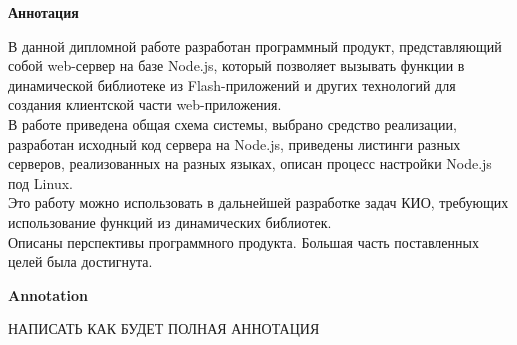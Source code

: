 \begin{center}
\textbf{Аннотация}
\end{center}
В данной дипломной работе разработан программный продукт, представляющий собой web-сервер на базе Node.js, который позволяет вызывать функции в динамической библиотеке из Flash-приложений и других технологий для создания клиентской части web-приложения.\\
В работе приведена общая схема системы, выбрано средство реализации, разработан исходный код сервера на Node.js, приведены листинги разных серверов, реализованных на разных языках, описан процесс настройки Node.js под Linux.\\
Это работу можно использовать в дальнейшей разработке задач КИО, требующих использование функций из динамических библиотек. \\
Описаны перспективы программного продукта. Большая часть поставленных целей была достигнута.

\newpage
\begin{center}
\textbf{Annotation}
\end{center}
НАПИСАТЬ КАК БУДЕТ ПОЛНАЯ АННОТАЦИЯ